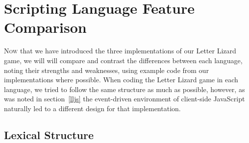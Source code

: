 \section{Scripting Language Feature Comparison}
\label{comparison}









\lettrine[nindent=0em,lines=3]{N}{ow} that we have introduced the three implementations of
our Letter Lizard game, we will will compare and contrast the differences between
each language, noting their strengths and weaknesses, using example code from our
implementations where possible. When coding the Letter Lizard game in each language,
we tried to follow the same structure as much as possible, however, as was noted in section~\ref{lljs}
the event-driven environment of client-side JavaScript naturally led to a different
design for that implementation. 

\subsection{Lexical Structure}


